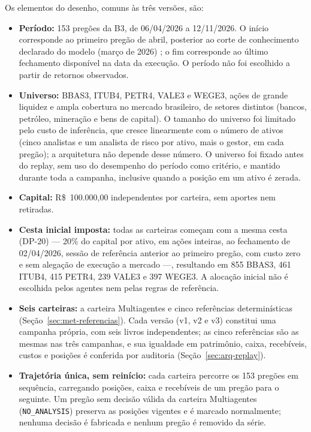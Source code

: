Os elementos do desenho, comuns às três versões, são:

\begin{itemize}
    \item \textbf{Período:} 153 pregões da B3, de 06/04/2026 a 12/11/2026. O início corresponde ao primeiro pregão de abril, posterior ao corte de conhecimento declarado do modelo (março de 2026) \citep{GeminiModelCard2026}; o fim corresponde ao último fechamento disponível na data da execução. O período não foi escolhido a partir de retornos observados.
    \item \textbf{Universo:} BBAS3, ITUB4, PETR4, VALE3 e WEGE3, ações de grande liquidez e ampla cobertura no mercado brasileiro, de setores distintos (bancos, petróleo, mineração e bens de capital). O tamanho do universo foi limitado pelo custo de inferência, que cresce linearmente com o número de ativos (cinco analistas e um analista de risco por ativo, mais o gestor, em cada pregão); a arquitetura não depende desse número. O universo foi fixado antes do replay, sem uso do desempenho do período como critério, e mantido durante toda a campanha, inclusive quando a posição em um ativo é zerada.
    \item \textbf{Capital:} R\$~100.000,00 independentes por carteira, sem aportes nem retiradas.
    \item \textbf{Cesta inicial imposta:} todas as carteiras começam com a mesma cesta (\mbox{DP-20}) --- 20\% do capital por ativo, em ações inteiras, ao fechamento de 02/04/2026, sessão de referência anterior ao primeiro pregão, com custo zero e sem alegação de execução a mercado ---, resultando em 855 BBAS3, 461 ITUB4, 415 PETR4, 239 VALE3 e 397 WEGE3. A alocação inicial não é escolhida pelos agentes nem pelas regras de referência.
    \item \textbf{Seis carteiras:} a carteira Multiagentes e cinco referências determinísticas (Seção~\ref{sec:met-referencias}). Cada versão (v1, v2 e v3) constitui uma campanha própria, com seis livros independentes; as cinco referências são as mesmas nas três campanhas, e sua igualdade em patrimônio, caixa, recebíveis, custos e posições é conferida por auditoria (Seção~\ref{sec:arq-replay}).
    \item \textbf{Trajetória única, sem reinício:} cada carteira percorre os 153 pregões em sequência, carregando posições, caixa e recebíveis de um pregão para o seguinte. Um pregão sem decisão válida da carteira Multiagentes (\texttt{NO\_ANALYSIS}) preserva as posições vigentes e é marcado normalmente; nenhuma decisão é fabricada e nenhum pregão é removido da série.

\end{itemize}
